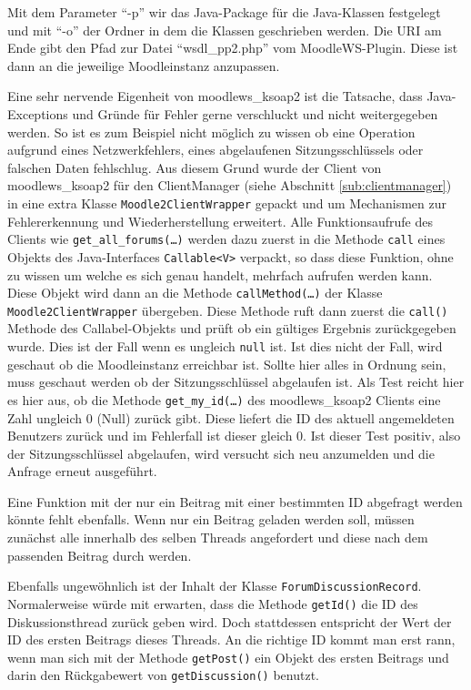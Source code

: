 Mit dem Parameter \enquote{-p} wir das Java-Package für die Java-Klassen festgelegt und mit \enquote{-o} der Ordner in dem die Klassen geschrieben werden. Die URI am Ende gibt den Pfad zur Datei \enquote{wsdl\_pp2.php} vom MoodleWS-Plugin. Diese ist dann an die jeweilige Moodleinstanz anzupassen.

Eine sehr nervende Eigenheit von moodlews\_ksoap2 ist die Tatsache, dass Java-Exceptions und Gründe für Fehler gerne verschluckt und nicht weitergegeben werden. So ist es zum Beispiel nicht möglich zu wissen ob eine Operation aufgrund eines Netzwerkfehlers, eines abgelaufenen Sitzungsschlüssels oder falschen Daten fehlschlug. Aus diesem Grund wurde der Client von moodlews\_ksoap2 für den ClientManager (siehe Abschnitt \ref{sub:clientmanager}) in eine extra Klasse \texttt{Moodle2ClientWrapper} gepackt und um Mechanismen zur Fehlererkennung und Wiederherstellung erweitert. Alle Funktionsaufrufe des Clients wie \texttt{get\_all\_forums(\dots)} werden dazu zuerst in die Methode \texttt{call} eines Objekts des Java-Interfaces \texttt{Callable<V>} verpackt, so dass diese Funktion, ohne zu wissen um welche es sich genau handelt, mehrfach aufrufen werden kann. Diese Objekt wird dann an die Methode \texttt{callMethod(\dots)} der Klasse \texttt{Moodle2ClientWrapper} übergeben. Diese Methode ruft dann zuerst die \texttt{call()} Methode des Callabel-Objekts und prüft ob ein gültiges Ergebnis zurückgegeben wurde. Dies ist der Fall wenn es ungleich \texttt{null} ist. Ist dies nicht der Fall, wird geschaut ob die Moodleinstanz erreichbar ist. Sollte hier alles in Ordnung sein, muss geschaut werden ob der Sitzungsschlüssel abgelaufen ist. Als Test reicht hier es hier aus, ob die Methode \texttt{get\_my\_id(\dots)} des moodlews\_ksoap2 Clients eine Zahl ungleich 0 (Null) zurück gibt. Diese liefert die ID des aktuell angemeldeten Benutzers zurück und im Fehlerfall ist dieser gleich 0. Ist dieser Test positiv, also der Sitzungsschlüssel abgelaufen, wird versucht sich neu anzumelden und die Anfrage erneut ausgeführt.

Eine Funktion mit der nur ein Beitrag mit einer bestimmten ID abgefragt werden könnte fehlt ebenfalls. Wenn nur ein Beitrag geladen werden soll, müssen zunächst alle innerhalb des selben Threads angefordert und diese nach dem passenden Beitrag durch werden. 

Ebenfalls ungewöhnlich ist der Inhalt der Klasse \texttt{ForumDiscussionRecord}. Normalerweise würde mit erwarten, dass die Methode \texttt{getId()} die ID des Diskussionsthread zurück geben wird. Doch stattdessen entspricht der Wert der ID des ersten Beitrags dieses Threads. An die richtige ID kommt man erst rann, wenn man sich mit der Methode \texttt{getPost()} ein Objekt des ersten Beitrags und darin den Rückgabewert von \texttt{getDiscussion()} benutzt.

